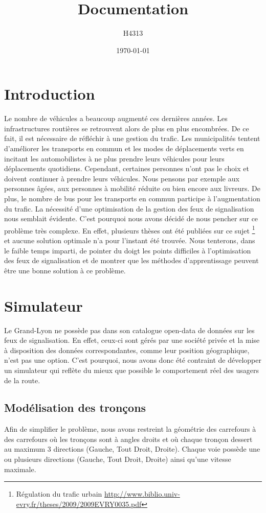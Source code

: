\documentclass[11pt]{article}
\title{Documentation}
\author{H4313}
\date{\today}
\begin{document}
\maketitle
\tableofcontents
\newpage

\section{Introduction}
Le nombre de véhicules a beaucoup augmenté ces dernières années. Les infrastructures routières se retrouvent alors de plus en plus encombrées. De ce fait, il est nécessaire de réfléchir à une gestion du trafic. Les municipalités tentent d'améliorer les transports en commun et les modes de déplacements verts en incitant les automobilistes à ne plus prendre leurs véhicules pour leurs déplacements quotidiens. Cependant, certaines personnes n'ont pas le choix et doivent continuer à prendre leurs véhicules. Nous pensons par exemple aux personnes âgées, aux personnes à mobilité réduite ou bien encore aux livreurs. De plus, le nombre de bus pour les transports en commun participe à l'augmentation du trafic. La nécessité d'une optimisation de la gestion des feux de signalisation nous semblait évidente. C'est pourquoi nous avons décidé de nous pencher sur ce problème très complexe. En effet, plusieurs thèses ont été publiées sur ce sujet \footnote{Régulation du trafic urbain \url{http://www.biblio.univ-evry.fr/theses/2009/2009EVRY0035.pdf}} et aucune solution optimale n'a pour l'instant été trouvée. Nous tenterons, dans le faible temps imparti, de pointer du doigt les points difficiles à l'optimisation des feux de signalisation et de montrer que les méthodes d'apprentissage peuvent être une bonne solution à ce problème.

\section{Simulateur}
Le Grand-Lyon ne possède pas dans son catalogue open-data de données sur les feux de signalisation. En effet, ceux-ci sont gérés par une société privée et la mise à disposition des données correspondantes, comme leur position géographique, n'est pas une option. C'est pourquoi, nous avons donc été contraint de développer un simulateur qui reflète du mieux que possible le comportement réel des usagers de la route.

\subsection{Modélisation des tronçons}
Afin de simplifier le problème, nous avons restreint la géométrie des carrefours à des carrefours où les tronçons sont à angles droits et où chaque tronçon dessert au maximum 3 directions (Gauche, Tout Droit, Droite). Chaque voie possède une ou plusieurs directions (Gauche, Tout Droit, Droite) ainsi qu'une vitesse maximale.
\end{document}
